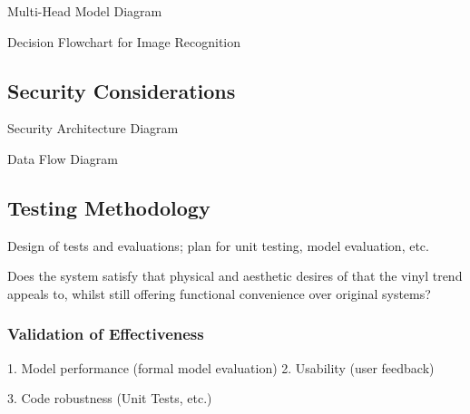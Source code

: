                 \begin{temp}
                    Multi-Head Model Diagram
                \end{temp}
    
                \begin{temp}
                    Decision Flowchart for Image Recognition
                \end{temp}
        
        \subsection{Security Considerations}
    
            \begin{temp}
                Security Architecture Diagram
            \end{temp}
    
            \begin{temp}
                Data Flow Diagram
            \end{temp}
        
        \subsection{Testing Methodology}
    
            \begin{temp}
                Design of tests and evaluations; plan for unit testing, model evaluation, etc.
                
                Does the system satisfy that physical and aesthetic desires of that the vinyl trend appeals to, whilst still offering functional convenience over original systems?
            \end{temp}
            
            \subsubsection{Validation of Effectiveness}
                \begin{temp}
                1. Model performance (formal model evaluation)
                2. Usability (user feedback)
                
                3. Code robustness (Unit Tests, etc.)
                \end{temp}
        

